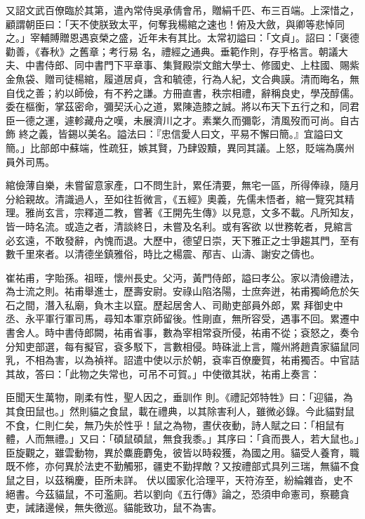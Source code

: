 \begin{pinyinscope}
 又詔文武百僚臨於其第，遣內常侍吳承倩會吊，贈絹千匹、布三百端。上深惜之，顧謂朝臣曰：「天不使朕致太平，何奪我楊綰之速也！俯及大斂，與卿等悲悼同之。」宰輔賻贈恩遇哀榮之盛，近年未有其比。太常初謚曰：「文貞」。詔曰：「褒德勸善，《春秋》之舊章；考行易
 名，禮經之通典。垂範作則，存乎格言。朝議大夫、中書侍郎、同中書門下平章事、集賢殿崇文館大學士、修國史、上柱國、賜紫金魚袋、贈司徒楊綰，履道居貞，含和毓德，行為人紀，文合典謨。清而晦名，無自伐之善；約以師儉，有不矜之謙。方冊直書，秩宗相禮，辭稱良史，學茂醇儒。委在樞衡，掌茲密命，彌契沃心之道，累陳造膝之誠。將以布天下五行之和，同君臣一德之運，遽軫藏舟之嘆，未展濟川之才。素業久而彌彰，清風歿而可尚。自古飾
 終之義，皆錫以美名。謚法曰：『忠信愛人曰文，平易不懈曰簡。』宜謚曰文簡。」比部郎中蘇端，性疏狂，嫉其賢，乃肆毀黷，異同其議。上怒，貶端為廣州員外司馬。



 綰儉薄自樂，未嘗留意家產，口不問生計，累任清要，無宅一區，所得俸祿，隨月分給親故。清識過人，至如往哲微言，《五經》奧義，先儒未悟者，綰一覽究其精理。雅尚玄言，宗釋道二教，嘗著《王開先生傳》以見意，文多不載。凡所知友，皆一時名流。或造之者，清談終日，未嘗及名利。或有客欲
 以世務乾者，見綰言必玄遠，不敢發辭，內愧而退。大歷中，德望日崇，天下雅正之士爭趨其門，至有數千里來者。以清德坐鎮雅俗，時比之楊震、邴吉、山濤、謝安之儔也。



 崔祐甫，字貽孫。祖晊，懷州長史。父沔，黃門侍郎，謚曰孝公。家以清儉禮法，為士流之則。祐甫舉進士，歷壽安尉。安祿山陷洛陽，士庶奔迸，祐甫獨崎危於矢石之間，潛入私廟，負木主以竄。歷起居舍人、司勛吏部員外郎，累
 拜御史中丞、永平軍行軍司馬，尋知本軍京師留後。性剛直，無所容受，遇事不回。累遷中書舍人。時中書侍郎闕，祐甫省事，數為宰相常袞所侵，祐甫不從；袞怒之，奏令分知吏部選，每有擬官，袞多駁下，言數相侵。時硃泚上言，隴州將趙貴家貓鼠同乳，不相為害，以為禎祥。詔遣中使以示於朝，袞率百僚慶賀，祐甫獨否。中官詰其故，答曰：「此物之失常也，可吊不可賀。」中使徵其狀，祐甫上奏言：



 臣聞天生萬物，剛柔有性，聖人因之，垂訓作
 則。《禮記郊特牲》曰：「迎貓，為其食田鼠也。」然則貓之食鼠，載在禮典，以其除害利人，雖微必錄。今此貓對鼠不食，仁則仁矣，無乃失於性乎！鼠之為物，晝伏夜動，詩人賦之曰：「相鼠有體，人而無禮。」又曰：「碩鼠碩鼠，無食我黍。」其序曰：「貪而畏人，若大鼠也。」臣旋觀之，雖雲動物，異於麋鹿麝兔，彼皆以時殺獲，為國之用。貓受人養育，職既不修，亦何異於法吏不勤觸邪，疆吏不勤捍敵？又按禮部式具列三瑞，無貓不食鼠之目，以茲稱慶，臣所未詳。
 伏以國家化洽理平，天符洊至，紛綸雜沓，史不絕書。今茲貓鼠，不可濫廁。若以劉向《五行傳》論之，恐須申命憲司，察聽貪吏，誡諸邊候，無失徼巡。貓能致功，鼠不為害。




\end{pinyinscope}
